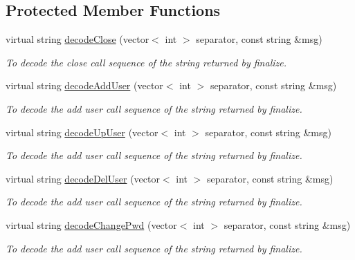 \subsection*{Protected Member Functions}
\begin{DoxyCompactItemize}
\item 
virtual string \hyperlink{classUMSMapper_a145a0e6311e595394f5f07da1a3a989b}{decodeClose} (vector$<$ int $>$ separator, const string \&msg)
\begin{DoxyCompactList}\small\item\em To decode the close call sequence of the string returned by finalize. \item\end{DoxyCompactList}\item 
virtual string \hyperlink{classUMSMapper_a1f5caa2c4e02967efb3dc741813831a7}{decodeAddUser} (vector$<$ int $>$ separator, const string \&msg)
\begin{DoxyCompactList}\small\item\em To decode the add user call sequence of the string returned by finalize. \item\end{DoxyCompactList}\item 
virtual string \hyperlink{classUMSMapper_afc32e4e8ec824a76c57577d234a46f7c}{decodeUpUser} (vector$<$ int $>$ separator, const string \&msg)
\begin{DoxyCompactList}\small\item\em To decode the add user call sequence of the string returned by finalize. \item\end{DoxyCompactList}\item 
virtual string \hyperlink{classUMSMapper_a63cdc4905b7ad965c410cdccff455329}{decodeDelUser} (vector$<$ int $>$ separator, const string \&msg)
\begin{DoxyCompactList}\small\item\em To decode the add user call sequence of the string returned by finalize. \item\end{DoxyCompactList}\item 
virtual string \hyperlink{classUMSMapper_afc9f56ce3627876213876ebbb0c3cedb}{decodeChangePwd} (vector$<$ int $>$ separator, const string \&msg)
\begin{DoxyCompactList}\small\item\em To decode the add user call sequence of the string returned by finalize. \item\end{DoxyCompactList}\item 

\end{DoxyCompactItemize}
